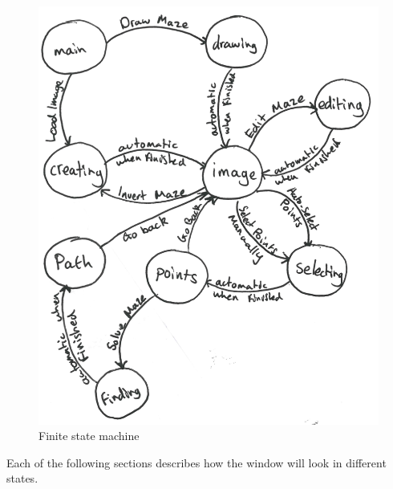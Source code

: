 \documentclass[titlepage]{article}
\begin{document}
\begin{figure}[H]
  \centering
  \includegraphics[width=12cm]{FSM.png}
  \caption{Finite state machine}
  \label{fig:dijk}
\end{figure}

Each of the following sections describes how the window will look in different states.
\end{document}
